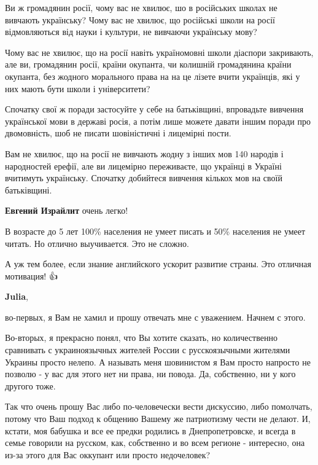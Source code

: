 \begin{itemize}
\begin{itemize}
Ви ж громадянин росії, чому вас не хвилює, шо в російських школах не вивчають
українську? Чому вас не хвилює, що російські школи на росії відмовляються від
науки і культури, не вивчаючи українську мову? 

Чому вас не хвилює, що на росії навіть україномовні школи діаспори закривають,
але ви, громадянин росії, країни окупанта, чи колишній громадянина країни
окупанта, без жодного морального права на на це лізете вчити українців, які у
них мають бути школи і університети?

Спочатку свої ж поради застосуйте у себе на батьківщині, впровадьте вивчення
української мови в державі росія, а потім лише можете давати іншим поради про
двомовність, шоб не писати шовіністичні і лицемірні пости. 

Вам не хвилює, що на росії не вивчають жодну з інших мов 140 народів і
народностей ерефії, але ви лицемірно переживаєте, що українці в Україні
вчитимуть українську. Спочатку добийтеся вивчення кількох мов на своїй
батьківщині.

 
\textbf{Евгений Израйлит} очень легко!

В возрасте до 5 лет 100\% населения не умеет писать и 50\% населения не умеет
читать. Но отлично выучивается. Это не сложно.

А уж тем более, если знание английского ускорит развитие страны. Это отличная
мотивация! 👍


 

\textbf{Julia}, 

во-первых, я Вам не хамил и прошу отвечать мне с уважением. Начнем с этого. 

Во-вторых, я прекрасно понял, что Вы хотите сказать, но количественно
сравнивать с украиноязычных жителей России с русскоязычными жителями Украины
просто нелепо. А называть меня шовинистом я Вам просто напросто не позволю - у
вас для этого нет ни права, ни повода. Да, собственно, ни у кого другого тоже.

Так что очень прошу Вас либо по-человечески вести дискуссию, либо помолчать,
потому что Ваш подход к общению Вашему же патриотизму чести не делают. И,
кстати, моя бабушка и все ее предки родились в Днепропетровске, и всегда в
семье говорили на русском, как, собственно и во всем регионе - интересно, она
из-за этого для Вас оккупант или просто недочеловек?


\end{itemize}
\end{itemize}
